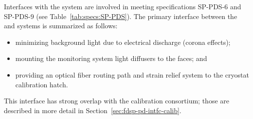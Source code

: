 



Interfaces with the  system are involved in meeting specifications SP-PDS-6 and SP-PDS-9 (see Table~\ref{tab:specs:SP-PDS}).  The primary interface between the  and  systems is summarized as follows:
\begin{itemize}
    \item minimizing background light due to electrical discharge (corona effects);
    \item mounting the  monitoring system light diffusers to the  faces; and 
    \item providing an optical fiber routing path and strain relief system to the cryostat calibration hatch.
\end{itemize} 


This interface has strong overlap with the calibration consortium; those are described in more detail in Section~\ref{sec:fdsp-pd-intfc-calib}.


